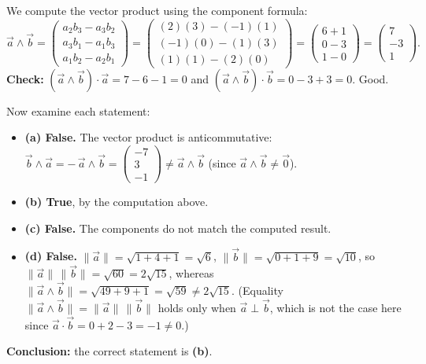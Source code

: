 \documentclass[11pt]{article}
\newcommand{\cle}[1]{{\popxbold\color{popdark}#1}}
\begin{document}
\begin{corrige}
We compute the vector product using the component formula:
\[
\vec{a} \wedge \vec{b} = \begin{pmatrix} a_2 b_3 - a_3 b_2 \\ a_3 b_1 - a_1 b_3 \\ a_1 b_2 - a_2 b_1 \end{pmatrix}
= \begin{pmatrix} (2)(3) - (-1)(1) \\ (-1)(0) - (1)(3) \\ (1)(1) - (2)(0) \end{pmatrix}
= \begin{pmatrix} 6 + 1 \\ 0 - 3 \\ 1 - 0 \end{pmatrix}
= \begin{pmatrix} 7 \\ -3 \\ 1 \end{pmatrix}.
\]
\textbf{Check:} $(\vec{a} \wedge \vec{b}) \cdot \vec{a} = 7 - 6 - 1 = 0$ and $(\vec{a} \wedge \vec{b}) \cdot \vec{b} = 0 - 3 + 3 = 0$. Good.

Now examine each statement:
\begin{itemize}
\item \textbf{(a) False.} The vector product is \cle{anticommutative}: $\vec{b} \wedge \vec{a} = -\,\vec{a} \wedge \vec{b} = \begin{pmatrix} -7 \\ 3 \\ -1 \end{pmatrix} \neq \vec{a} \wedge \vec{b}$ (since $\vec{a} \wedge \vec{b} \neq \vec{0}$).
\item \textbf{(b) True}, by the computation above.
\item \textbf{(c) False.} The components do not match the computed result.
\item \textbf{(d) False.} $\|\vec{a}\| = \sqrt{1+4+1} = \sqrt{6}$, $\|\vec{b}\| = \sqrt{0+1+9} = \sqrt{10}$, so $\|\vec{a}\|\,\|\vec{b}\| = \sqrt{60} = 2\sqrt{15}$, whereas $\|\vec{a} \wedge \vec{b}\| = \sqrt{49+9+1} = \sqrt{59} \neq 2\sqrt{15}$. (Equality $\|\vec{a} \wedge \vec{b}\| = \|\vec{a}\|\,\|\vec{b}\|$ holds only when $\vec{a} \perp \vec{b}$, which is not the case here since $\vec{a} \cdot \vec{b} = 0 + 2 - 3 = -1 \neq 0$.)
\end{itemize}
\textbf{Conclusion:} the correct statement is \textbf{(b)}.
\end{corrige}
\end{document}
